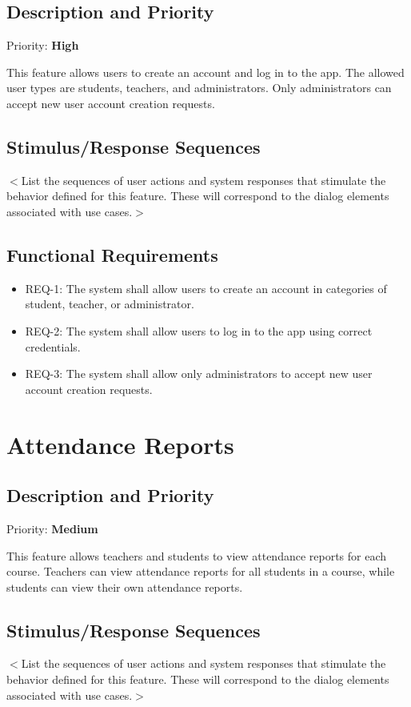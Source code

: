 \documentclass{scrreprt}
\begin{document}
\subsection{Description and Priority}
Priority: \textbf{High}

This feature allows users to create an account and log in to the app. The allowed user types are students, teachers, and administrators. 
Only administrators can accept new user account creation requests.
\subsection{Stimulus/Response Sequences}
$<$List the sequences of user actions and system responses that stimulate the 
behavior defined for this feature. These will correspond to the dialog elements 
associated with use cases.$>$

\subsection{Functional Requirements}
\begin{itemize}
    \item REQ-1: The system shall allow users to create an account in categories of student, teacher, or administrator.
    \item REQ-2: The system shall allow users to log in to the app using correct credentials.
    \item REQ-3: The system shall allow only administrators to accept new user account creation requests.
\end{itemize}


\section{Attendance Reports}
\subsection{Description and Priority}
Priority: \textbf{Medium}

This feature allows teachers and students to view attendance reports for each course. Teachers can view attendance reports for all students in a course, while students can view their own attendance reports.
\subsection{Stimulus/Response Sequences}
$<$List the sequences of user actions and system responses that stimulate the 
behavior defined for this feature. These will correspond to the dialog elements 
associated with use cases.$>$
\end{document}
